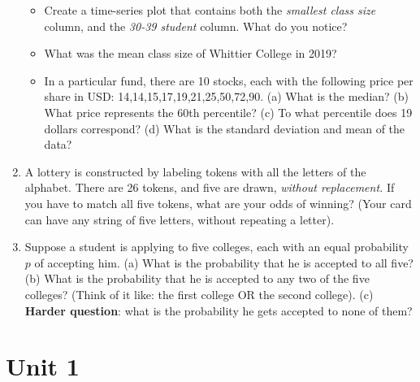 \documentclass{article}
\begin{document}
\begin{enumerate}
\begin{itemize}
\item Create a time-series plot that contains both the \textit{smallest class size} column, and the \textit{30-39 student} column.  What do you notice? \\ \vspace{2cm}
\item What was the mean class size of Whittier College in 2019? \\ \vspace{1cm}
\item In a particular fund, there are 10 stocks, each with the following price per share in USD: 14,14,15,17,19,21,25,50,72,90.  (a) What is the median?  (b) What price represents the 60th percentile? (c) To what percentile does 19 dollars correspond? (d) What is the standard deviation and mean of the data? \\ \vspace{2cm}
\end{itemize}
\item A lottery is constructed by labeling tokens with all the letters of the alphabet.  There are 26 tokens, and five are drawn, \textit{without replacement.}  If you have to match all five tokens, what are your odds of winning?  (Your card can have any string of five letters, without repeating a letter). \\ \vspace{1cm}
\item Suppose a student is applying to five colleges, each with an equal probability $p$ of accepting him.  (a) What is the probability that he is accepted to all five?  (b) What is the probability that he is accepted to any two of the five colleges? (Think of it like: the first college OR the second college). (c) \textbf{Harder question}: what is the probability he gets accepted to none of them? \\ \vspace{1cm}
\end{enumerate}

\clearpage

\section{Unit 1}
\end{document}

